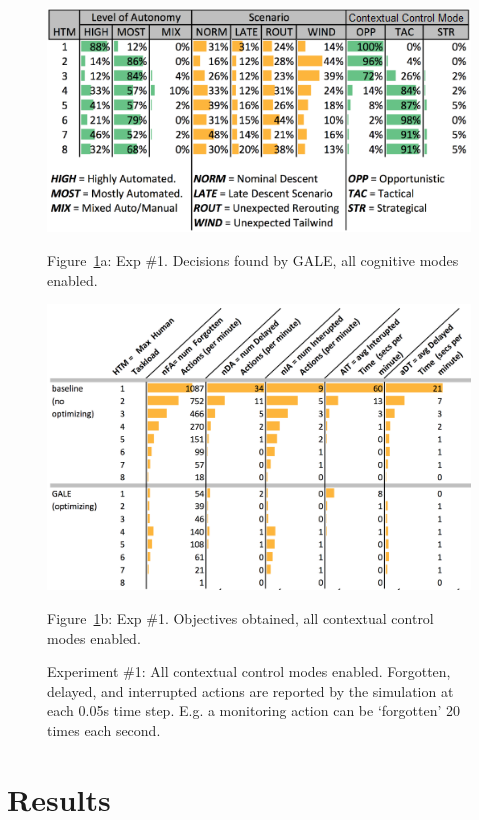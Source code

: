 \documentclass[journal]{IEEEtran}
\newcommand{\fig}[1]{Figure~\ref{fig:#1}}
\begin{document}
\begin{figure}
\begin{center}

\includegraphics[width=4.5in]{figures/GALE,decisions,Opp}

\fig{all}a:  Exp \#1. Decisions found by GALE,  all cognitive modes enabled.

\includegraphics[width=5.25in]{figures/objectives,Opp}

\fig{all}b: Exp \#1.  Objectives obtained, all contextual control modes enabled.
\end{center}

\caption{Experiment \#1: All contextual control modes enabled. 
Forgotten, delayed, and interrupted actions are reported by the simulation at each 0.05s time step.  
E.g. a monitoring action can be `forgotten' 20 times each second.  }\label{fig:all}
\end{figure}

\section{Results}
\end{document}
